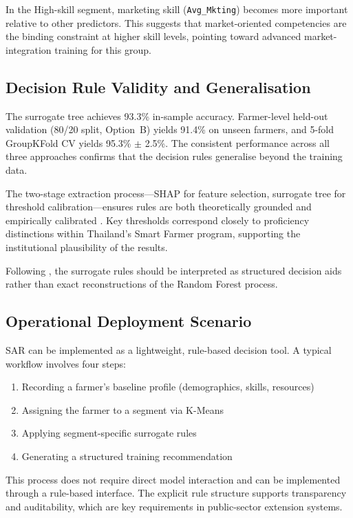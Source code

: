 \documentclass[3p,twocolumn,authoryear]{elsarticle}
\begin{document}
In the High-skill segment, marketing skill (\texttt{Avg\_Mkting}) becomes
more important relative to other predictors.
This suggests that market-oriented competencies are the binding constraint
at higher skill levels, pointing toward advanced market-integration
training for this group.

\subsection{Decision Rule Validity and Generalisation}

The surrogate tree achieves 93.3\% in-sample accuracy.
Farmer-level held-out validation (80/20 split, Option~B) yields 91.4\%
on unseen farmers, and 5-fold GroupKFold CV yields 95.3\% $\pm$ 2.5\%.
The consistent performance across all three approaches confirms that the
decision rules generalise beyond the training data.

The two-stage extraction process---SHAP for feature selection, surrogate
tree for threshold calibration---ensures rules are both theoretically
grounded and empirically calibrated \citep{molnar2022}.
Key thresholds correspond closely to proficiency distinctions within
Thailand's Smart Farmer program, supporting the institutional plausibility
of the results.

Following \citet{rudin2019}, the surrogate rules should be interpreted as
structured decision aids rather than exact reconstructions of the Random
Forest process.

\subsection{Operational Deployment Scenario}

SAR can be implemented as a lightweight, rule-based decision tool.
A typical workflow involves four steps:
\begin{enumerate}
  \item Recording a farmer's baseline profile (demographics, skills, resources)
  \item Assigning the farmer to a segment via K-Means
  \item Applying segment-specific surrogate rules
  \item Generating a structured training recommendation
\end{enumerate}
This process does not require direct model interaction and can be
implemented through a rule-based interface.
The explicit rule structure supports transparency and auditability, which
are key requirements in public-sector extension systems.
\end{document}
